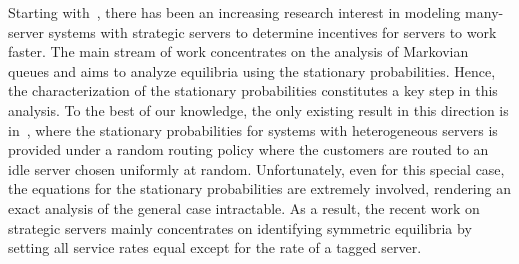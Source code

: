 \documentclass[a4paper,11pt,twoside]{article}
\numberwithin{equation}{section}
\numberwithin{figure}{section}
\theoremstyle{plain}
\newcommand{\1}{\mathbbm{1}}
\begin{document}

Starting with~\cite{Gopalakrishnan_etal2016}, there has been an increasing research interest in modeling many-server systems with strategic servers to determine incentives for servers to work faster. The main stream of work concentrates on the analysis of Markovian queues and aims to analyze equilibria using the stationary probabilities. Hence, the characterization of the stationary probabilities constitutes a key step in this analysis. To the best of our knowledge, the only existing result in this direction is in~\cite{Gumbel1960}, where the stationary probabilities for systems with heterogeneous servers is provided under a random routing policy where the customers are routed to an idle server chosen uniformly at random. Unfortunately, even for this special case, the equations for the stationary probabilities are extremely involved, rendering an exact analysis of the general case intractable. As a result, the recent work on strategic servers mainly concentrates on identifying symmetric equilibria by setting all service rates equal except for the rate of a tagged server.
\end{document}

